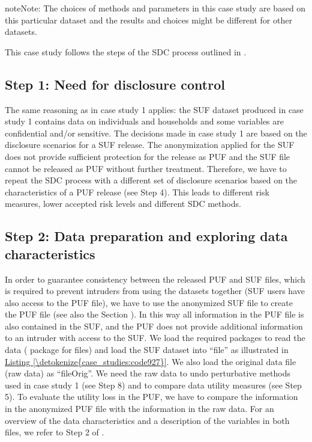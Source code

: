 \documentclass[letterpaper,10pt,english]{sphinxmanual}
\begin{document}
\begin{sphinxadmonition}{note}{Note:}
The choices of methods and parameters in this case study are based on this particular dataset and the results and
choices might be different for other datasets.
\end{sphinxadmonition}

This case study follows the steps of the SDC process outlined in
.


\subsection{Step 1: Need for disclosure control}
\label{\detokenize{case_studies:id4}}
The same reasoning as in case study 1 applies: the SUF dataset produced
in case study 1 contains data on individuals and households and some
variables are confidential and/or sensitive. The decisions made in case
study 1 are based on the disclosure scenarios for a SUF release. The
anonymization applied for the SUF does not provide sufficient protection
for the release as PUF and the SUF file cannot be released as PUF
without further treatment. Therefore, we have to repeat the SDC process
with a different set of disclosure scenarios based on the
characteristics of a PUF release (see Step 4). This leads to different
risk measures, lower accepted risk levels and different SDC methods.


\subsection{Step 2: Data preparation and exploring data characteristics}
\label{\detokenize{case_studies:id5}}
In order to guarantee consistency between the released PUF and SUF
files, which is required to prevent intruders from using the datasets
together (SUF users have also access to the PUF file), we have to use
the anonymized SUF file to create the PUF file (see also the Section
).
In this way all information in the PUF file is also contained in the
SUF, and the PUF does not provide additional information to an intruder
with access to the SUF. We load the required packages to read the data
( package for  files) and load the SUF dataset into
“file” as illustrated in \hyperref[\detokenize{case_studies:code927}]{Listing \ref{\detokenize{case_studies:code927}}}. We also load the original data
file (raw data) as “fileOrig”. We need the raw data to undo perturbative
methods used in case study 1 (see Step 8) and to compare data utility
measures (see Step 5). To evaluate the utility loss in the PUF, we have
to compare the information in the anonymized PUF file with the
information in the raw data. For an overview of the data characteristics
and a description of the variables in both files, we refer to Step 2 of
{\hyperref[\detokenize{case_studies:case-study-1-suf}]{}} .
\end{document}
